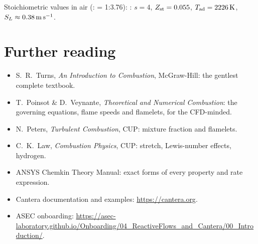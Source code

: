 Stoichiometric values in air (: = 1:3.76): : $s=4$, $Z_{\mathrm{st}}=0.055$,
$T_{\mathrm{ad}}=\SI{2226}{\kelvin}$, $S_L\approx\SI{0.38}{\metre\per\second}$.

\section*{Further reading}
\begin{itemize}
  \item S.~R.~Turns, \emph{An Introduction to Combustion}, McGraw-Hill: the gentlest complete textbook.
  \item T.~Poinsot \& D.~Veynante, \emph{Theoretical and Numerical Combustion}: the governing equations,
        flame speeds and flamelets, for the CFD-minded.
  \item N.~Peters, \emph{Turbulent Combustion}, CUP: mixture fraction and flamelets.
  \item C.~K.~Law, \emph{Combustion Physics}, CUP: stretch, Lewis-number effects, hydrogen.
  \item ANSYS Chemkin Theory Manual: exact forms of every property and rate expression.
  \item Cantera documentation and examples: \url{https://cantera.org}.
  \item ASEC onboarding: \url{https://asec-laboratory.github.io/Onboarding/04_ReactiveFlows_and_Cantera/00_Introduction/}.
\end{itemize}
